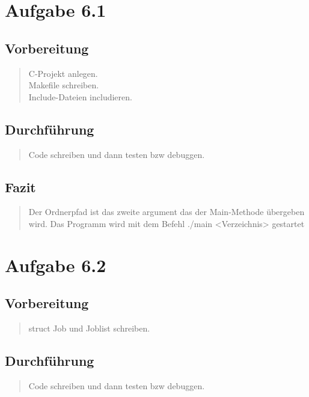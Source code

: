 \section{Aufgabe 6.1}
	\subsection{Vorbereitung}
		\begin{quote}
			C-Projekt anlegen.\\
			Makefile schreiben.\\
			Include-Dateien includieren.\\ 
		\end{quote}
	\subsection{Durchführung}
		\begin{quote}
			Code schreiben und dann testen bzw debuggen.\\
		\end{quote}
	\subsection{Fazit}
		\begin{quote}
			\small
			Der Ordnerpfad ist das zweite argument das der Main-Methode \"ubergeben wird. Das Programm wird mit dem Befehl ./main <Verzeichnis> gestartet\\
		\end{quote}

\section{Aufgabe 6.2}
	\subsection{Vorbereitung}
		\begin{quote}
			
			struct Job und Joblist schreiben.\\
		\end{quote}
	\subsection{Durchführung}
		\begin{quote}
			Code schreiben und dann testen bzw debuggen.\\
		\end{quote}
